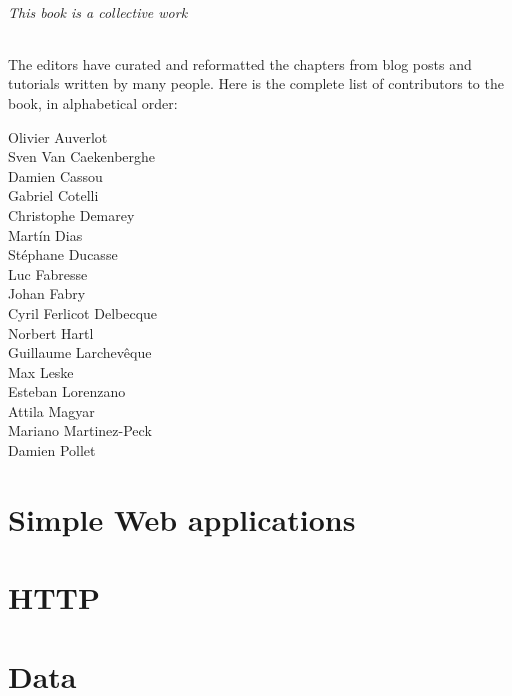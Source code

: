 \documentclass[10pt,twoside,english,showtrims]{support/latex/sbabook/sbabook}
\begin{document}
\paragraph{This book is a collective work}
The editors have curated and reformatted the chapters from blog posts
and tutorials written by many people. Here is the complete list of contributors
to the book, in alphabetical order:

\begin{multicols}{3}
Olivier Auverlot\\
Sven Van Caekenberghe\\
Damien Cassou\\
Gabriel Cotelli\\
Christophe Demarey\\
Martín Dias\\
Stéphane Ducasse\\
Luc Fabresse\\
Johan Fabry\\
Cyril Ferlicot Delbecque\\
Norbert Hartl\\
Guillaume Larchevêque\\
Max Leske\\
Esteban Lorenzano\\
Attila Magyar\\
Mariano Martinez-Peck\\
Damien Pollet\\
\end{multicols}

\tableofcontents*
\clearpage\listoffigures

\mainmatter

\part{Simple Web applications}



\part{HTTP}





\part{Data}





\end{document}
